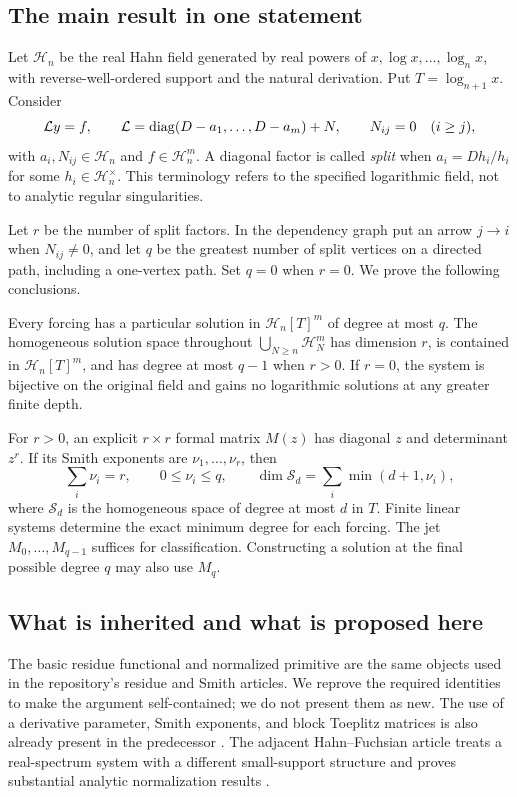 \documentclass[11pt,a4paper]{article}
\numberwithin{equation}{section}
\theoremstyle{definition}
\theoremstyle{remark}\newtheorem{remark}[theorem]{Remark}
\newcommand{\Hh}{\mathcal H}\newcommand{\Ll}{\mathcal L}
\begin{document}
\subsection{The main result in one statement}
Let $\Hh_n$ be the real Hahn field generated by real powers of $x,\log x,\ldots,\log_n x$, with reverse-well-ordered support and the natural derivation. Put $T=\log_{n+1}x$. Consider
\begin{equation}
 \Ll y=f,\qquad
 \Ll=\diag(D-a_1,\ldots,D-a_m)+N,
 \qquad N_{ij}=0\quad(i\ge j),
 \label{eq:system-intro}
\end{equation}
with $a_i,N_{ij}\in\Hh_n$ and $f\in\Hh_n^m$. A diagonal factor is called \emph{split} when $a_i=Dh_i/h_i$ for some $h_i\in\Hh_n^\times$. This terminology refers to the specified logarithmic field, not to analytic regular singularities.

Let $r$ be the number of split factors. In the dependency graph put an arrow $j\to i$ when $N_{ij}\ne0$, and let $q$ be the greatest number of split vertices on a directed path, including a one-vertex path. Set $q=0$ when $r=0$. We prove the following conclusions.

Every forcing has a particular solution in $\Hh_n[T]^m$ of degree at most $q$. The homogeneous solution space throughout $\bigcup_{N\ge n}\Hh_N^m$ has dimension $r$, is contained in $\Hh_n[T]^m$, and has degree at most $q-1$ when $r>0$. If $r=0$, the system is bijective on the original field and gains no logarithmic solutions at any greater finite depth.

For $r>0$, an explicit $r\times r$ formal matrix $M(z)$ has diagonal $z$ and determinant $z^r$. If its Smith exponents are $\nu_1,\ldots,\nu_r$, then
\begin{equation}
 \sum_i\nu_i=r,\qquad 0\le\nu_i\le q,
 \qquad
 \dim\mathscr S_d=\sum_i\min(d+1,\nu_i),
 \label{eq:preview}
\end{equation}
where $\mathscr S_d$ is the homogeneous space of degree at most $d$ in $T$. Finite linear systems determine the exact minimum degree for each forcing. The jet $M_0,\ldots,M_{q-1}$ suffices for classification. Constructing a solution at the final possible degree $q$ may also use $M_q$.

\subsection{What is inherited and what is proposed here}
The basic residue functional and normalized primitive are the same objects used in the repository's residue and Smith articles. We reprove the required identities to make the argument self-contained; we do not present them as new. The use of a derivative parameter, Smith exponents, and block Toeplitz matrices is also already present in the predecessor \cite{repo-smith}. The adjacent Hahn--Fuchsian article treats a real-spectrum system with a different small-support structure and proves substantial analytic normalization results \cite{repo-fuchsian}.
\end{document}
